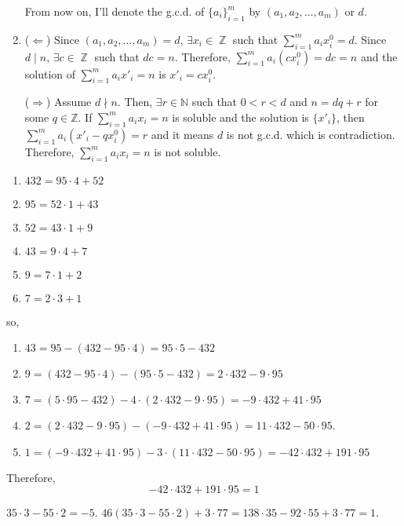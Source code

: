 \documentclass[12pt]{article}
\newenvironment{problem}[2][Problem]{\begin{trivlist}
\item[\hskip \labelsep {\bfseries #1}\hskip \labelsep {\bfseries #2.}]}{\end{trivlist}}
\DeclareMathOperator{\zz}{\mathbb{Z}}
\begin{document}
\begin{enumerate}
    From now on, I'll denote the g.c.d. of $\{a_i\}_{i=1}^m$ by $(a_1, a_2, \ldots, a_m)$ or $d$.
    
    \item[(c)] ($\Leftarrow$) Since $(a_1, a_2, \ldots, a_m)=d$, $\exists x_i\in \zz$ such that $\sum\limits_{i=1}^m a_i x^0_i=d$. Since $d\mid n$, $\exists c\in \zz$ such that $dc=n$. Therefore, $\sum\limits_{i=1}^m a_i (cx^0_i)=dc=n$ and the solution of $\sum\limits_{i=1}^m a_i x'_i=n$ is $x'_i=cx^0_i$.
    
    ($\Rightarrow$) Assume $d\nmid n$. Then, $\exists r\in \mathbb{N}$ such that $0<r<d$ and $n=dq+r$ for some $q\in \mathbb{Z}$. If $\sum\limits_{i=1}^m a_i x_i=n$ is soluble and the solution is $\{x'_i\}$, then $\sum\limits_{i=1}^m a_i(x'_i-qx^0_i)=r$ and it means $d$ is not g.c.d. which is contradiction. Therefore, $\sum\limits_{i=1}^m a_i x_i=n$ is not soluble.
\end{enumerate}



\newpage
\begin{problem}{2}
\end{problem}
\begin{enumerate}
\item $432=95\cdot 4+52$
\item $95=52\cdot 1+43$
\item $52=43\cdot 1+9$
\item $43=9\cdot 4+7$
\item $9=7 \cdot 1+2$
\item $7=2\cdot 3 +1$
\end{enumerate}
so,
\begin{enumerate}
\item $43=95-(432-95\cdot 4)=95\cdot 5-432$
\item $9=(432-95\cdot 4)-(95\cdot 5-432)=2\cdot 432 - 9\cdot 95$
\item $7=(5\cdot 95-432)-4\cdot (2\cdot 432 - 9\cdot 95)=-9\cdot 432 + 41\cdot 95$
\item $2=(2\cdot 432 - 9\cdot 95)-(-9\cdot 432 + 41\cdot 95)=11\cdot 432 - 50\cdot 95$.
\item $1=(-9\cdot 432 + 41\cdot 95)-3\cdot(11\cdot 432 - 50\cdot 95)=-42\cdot 432 + 191 \cdot 95$
\end{enumerate}

Therefore,
\begin{equation*}
    -42\cdot 432 + 191 \cdot 95=1
\end{equation*}
\begin{problem}{3}
\end{problem}
$35\cdot 3- 55\cdot 2=-5$. $46(35\cdot 3- 55\cdot 2)+3\cdot 77=138\cdot 35-92 \cdot 55+3\cdot 77=1$.
\end{document}
